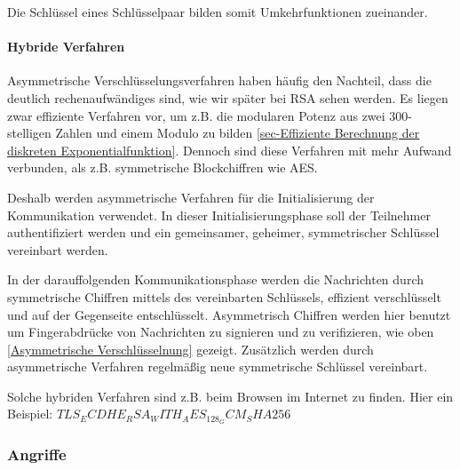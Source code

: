                Die Schlüssel eines Schlüsselpaar bilden somit Umkehrfunktionen zueinander.

            \paragraph{Hybride Verfahren}
            \label{Hybride Verfahren}
                Asymmetrische Verschlüsselungsverfahren haben häufig den Nachteil, dass die deutlich rechenaufwändiges sind, wie wir später bei \ac{RSA} sehen werden. Es liegen zwar effiziente Verfahren vor, um z.B. die modularen Potenz aus zwei 300-stelligen Zahlen und einem Modulo zu bilden \ref{sec-Effiziente Berechnung der diskreten Exponentialfunktion}. Dennoch sind diese Verfahren mit mehr Aufwand verbunden, als z.B. symmetrische Blockchiffren wie \ac{AES}.
                
                Deshalb werden asymmetrische Verfahren für die Initialisierung der Kommunikation verwendet. In dieser Initialisierungsphase soll der Teilnehmer authentifiziert werden und ein gemeinsamer, geheimer, symmetrischer Schlüssel vereinbart werden. 
                
                In der darauffolgenden Kommunikationsphase werden die Nachrichten durch symmetrische Chiffren mittels des vereinbarten Schlüssels, effizient verschlüsselt und auf der Gegenseite entschlüsselt. Asymmetrisch Chiffren werden hier benutzt um Fingerabdrücke von Nachrichten zu signieren und zu verifizieren, wie oben \ref{Asymmetrische Verschlüsselnung} gezeigt. Zusätzlich werden durch asymmetrische Verfahren regelmäßig neue symmetrische Schlüssel vereinbart.

                Solche hybriden Verfahren sind z.B. beim Browsen im Internet zu finden. Hier ein Beispiel: \textbf{$TLS_ECDHE_RSA_WITH_AES_128_GCM_SHA256$}



        \subsubsection{Angriffe}

            
